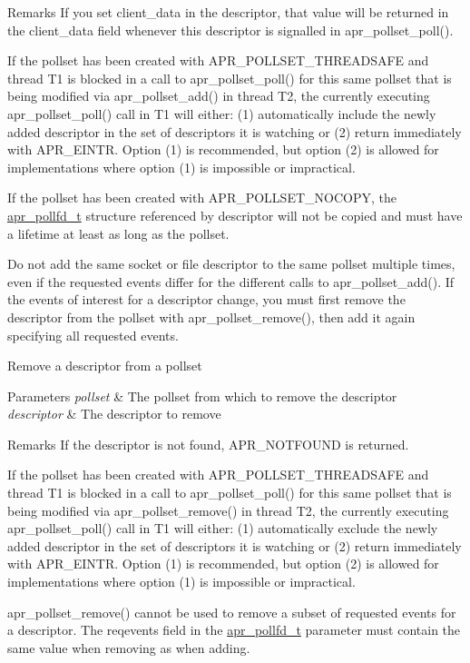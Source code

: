 \begin{DoxyRemark}{Remarks}
If you set client\+\_\+data in the descriptor, that value will be returned in the client\+\_\+data field whenever this descriptor is signalled in apr\+\_\+pollset\+\_\+poll(). 

If the pollset has been created with A\+P\+R\+\_\+\+P\+O\+L\+L\+S\+E\+T\+\_\+\+T\+H\+R\+E\+A\+D\+S\+A\+FE and thread T1 is blocked in a call to apr\+\_\+pollset\+\_\+poll() for this same pollset that is being modified via apr\+\_\+pollset\+\_\+add() in thread T2, the currently executing apr\+\_\+pollset\+\_\+poll() call in T1 will either\+: (1) automatically include the newly added descriptor in the set of descriptors it is watching or (2) return immediately with A\+P\+R\+\_\+\+E\+I\+N\+TR. Option (1) is recommended, but option (2) is allowed for implementations where option (1) is impossible or impractical. 

If the pollset has been created with A\+P\+R\+\_\+\+P\+O\+L\+L\+S\+E\+T\+\_\+\+N\+O\+C\+O\+PY, the \hyperlink{structapr__pollfd__t}{apr\+\_\+pollfd\+\_\+t} structure referenced by descriptor will not be copied and must have a lifetime at least as long as the pollset. 

Do not add the same socket or file descriptor to the same pollset multiple times, even if the requested events differ for the different calls to apr\+\_\+pollset\+\_\+add(). If the events of interest for a descriptor change, you must first remove the descriptor from the pollset with apr\+\_\+pollset\+\_\+remove(), then add it again specifying all requested events.
\end{DoxyRemark}
Remove a descriptor from a pollset 
\begin{DoxyParams}{Parameters}
{\em pollset} & The pollset from which to remove the descriptor \\
\hline
{\em descriptor} & The descriptor to remove \\
\hline
\end{DoxyParams}
\begin{DoxyRemark}{Remarks}
If the descriptor is not found, A\+P\+R\+\_\+\+N\+O\+T\+F\+O\+U\+ND is returned. 

If the pollset has been created with A\+P\+R\+\_\+\+P\+O\+L\+L\+S\+E\+T\+\_\+\+T\+H\+R\+E\+A\+D\+S\+A\+FE and thread T1 is blocked in a call to apr\+\_\+pollset\+\_\+poll() for this same pollset that is being modified via apr\+\_\+pollset\+\_\+remove() in thread T2, the currently executing apr\+\_\+pollset\+\_\+poll() call in T1 will either\+: (1) automatically exclude the newly added descriptor in the set of descriptors it is watching or (2) return immediately with A\+P\+R\+\_\+\+E\+I\+N\+TR. Option (1) is recommended, but option (2) is allowed for implementations where option (1) is impossible or impractical. 

apr\+\_\+pollset\+\_\+remove() cannot be used to remove a subset of requested events for a descriptor. The reqevents field in the \hyperlink{structapr__pollfd__t}{apr\+\_\+pollfd\+\_\+t} parameter must contain the same value when removing as when adding.
\end{DoxyRemark}
